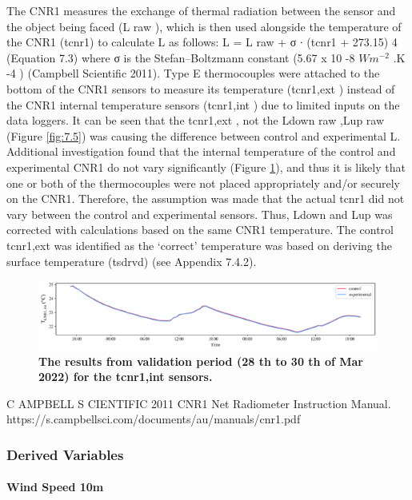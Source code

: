 \documentclass[final,3p,times,authoryear]{elsarticle}
\begin{document}
The CNR1 measures the exchange of thermal radiation between the sensor and the
object being faced (L raw ), which is then used alongside the temperature of the CNR1
(\gls{tcnr1}) to calculate L as follows:
L = L raw + σ ∙ (\gls{tcnr1} + 273.15) 4
(Equation 7.3)
where σ is the Stefan–Boltzmann constant (5.67 x 10 -8 $Wm^{-2}$ .K -4 ) (Campbell Scientific
2011).
Type E thermocouples were attached to the bottom of the CNR1 sensors to measure its
temperature (\gls{tcnr1},ext ) instead of the CNR1 internal temperature sensors (\gls{tcnr1},int ) due
to limited inputs on the data loggers. It can be seen that the \gls{tcnr1},ext , not the \gls{Ldown} raw ,\gls{Lup} raw
(Figure \ref{fig:7.5}) was causing the difference between control and experimental L.
Additional investigation found that the internal temperature of the control and
experimental CNR1 do not vary significantly (Figure \ref{fig:7.6}), and thus it is likely that one
or both of the thermocouples were not placed appropriately and/or securely on the
CNR1. Therefore, the assumption was made that the actual \gls{tcnr1} did not vary between
the control and experimental sensors. Thus, \gls{Ldown} and \gls{Lup} was corrected with calculations
based on the same CNR1 temperature.
The control \gls{tcnr1},ext was identified as the ‘correct' temperature was based on deriving
the surface temperature (\gls{tsdrvd}) (see Appendix 7.4.2).

\begin{figure}
\centering
\includegraphics[trim={0 0 0 0},clip,scale=1.0]{pict022.png}
\caption{\bf The results from validation period (28 th to 30 th of Mar 2022) for the \gls{tcnr1},int sensors.}
 \label{fig:7.6}
\end{figure}

C AMPBELL S CIENTIFIC 2011 CNR1 Net Radiometer Instruction Manual.
https://s.campbellsci.com/documents/au/manuals/cnr1.pdf


\subsubsection{Derived Variables}\label{sec:appendix7.4}
\paragraph{Wind Speed 10m}\label{sec:appendix7.4.1}
\end{document}
